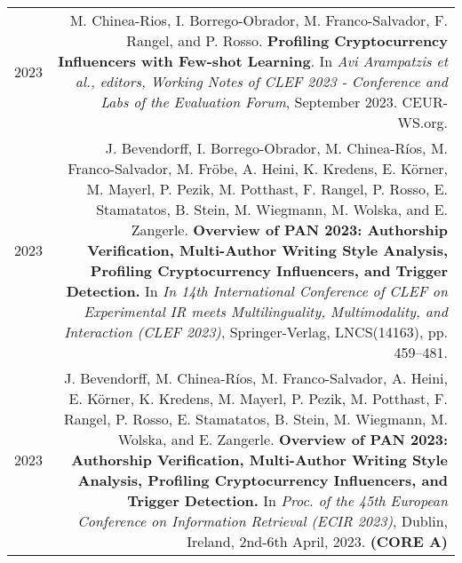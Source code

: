 \documentclass[10pt]{article}
\begin{document}
\begin{tabular}{L!{\VRule}R}
    2023 &  M. Chinea-Rios, I. Borrego-Obrador, M. Franco-Salvador, F. Rangel, and P. Rosso. \textbf{Profiling Cryptocurrency Influencers with Few-shot Learning}. In \emph{Avi Arampatzis et al., editors, Working Notes of CLEF 2023 - Conference and Labs of the Evaluation Forum}, September 2023. CEUR-WS.org. \vspace{5pt}\\
    2023 & J. Bevendorff, I. Borrego-Obrador, M. Chinea-Ríos, M. Franco-Salvador, M. Fröbe, A. Heini, K. Kredens, E. Körner, M. Mayerl, P. Pezik, M. Potthast, F. Rangel, P. Rosso, E. Stamatatos, B. Stein, M. Wiegmann, M. Wolska, and E. Zangerle. \textbf{Overview of PAN 2023: Authorship Verification, Multi-Author Writing Style Analysis, Profiling Cryptocurrency Influencers, and Trigger Detection.} In \emph{In 14th International Conference of CLEF on Experimental IR meets Multilinguality, Multimodality, and Interaction (CLEF 2023)}, Springer-Verlag, LNCS(14163), pp. 459--481. \vspace{5pt}\\
    2023 & J. Bevendorff, M. Chinea-Ríos, M. Franco-Salvador, A. Heini, E. Körner, K. Kredens, M. Mayerl, P. Pezik, M. Potthast, F. Rangel, P. Rosso, E. Stamatatos, B. Stein, M. Wiegmann, M. Wolska, and E. Zangerle. \textbf{Overview of PAN 2023: Authorship Verification, Multi-Author Writing Style Analysis, Profiling Cryptocurrency Influencers, and Trigger Detection.} In \emph{Proc. of the 45th European Conference on Information Retrieval (ECIR 2023)}, Dublin, Ireland, 2nd-6th April, 2023. \textbf{(CORE A)} \vspace{5pt}\\
\end{tabular}
\end{document}

